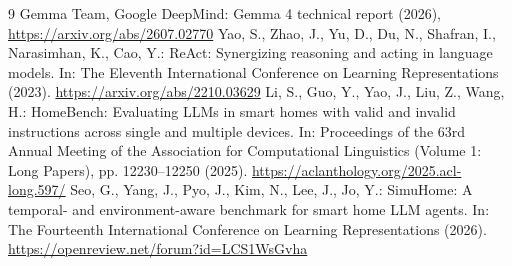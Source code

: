 \documentclass[a4paper,11pt]{article}
\begin{document}
\begin{thebibliography}{9}
 Gemma Team, Google DeepMind: Gemma 4 technical report (2026),
  \url{https://arxiv.org/abs/2607.02770}
 Yao, S., Zhao, J., Yu, D., Du, N., Shafran, I., Narasimhan, K., Cao, Y.: ReAct:
  Synergizing reasoning and acting in language models. In: The Eleventh International Conference
  on Learning Representations (2023). \url{https://arxiv.org/abs/2210.03629}
 Li, S., Guo, Y., Yao, J., Liu, Z., Wang, H.: HomeBench: Evaluating LLMs in
  smart homes with valid and invalid instructions across single and multiple devices. In:
  Proceedings of the 63rd Annual Meeting of the Association for Computational Linguistics
  (Volume 1: Long Papers), pp. 12230--12250 (2025). \url{https://aclanthology.org/2025.acl-long.597/}
 Seo, G., Yang, J., Pyo, J., Kim, N., Lee, J., Jo, Y.: SimuHome: A temporal- and
  environment-aware benchmark for smart home LLM agents. In: The Fourteenth International
  Conference on Learning Representations (2026). \url{https://openreview.net/forum?id=LCS1WsGvha}
\end{thebibliography}
\end{document}
